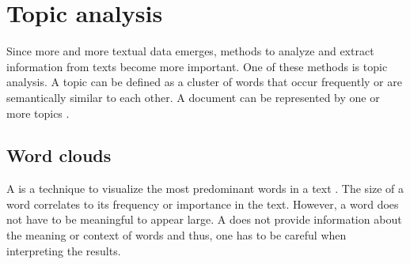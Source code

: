 \section{Topic analysis}\label{sec:topic-modeling}

Since more and more textual data emerges, methods to analyze and extract information from texts become more important.
One of these methods is topic analysis.
A topic can be defined as a cluster of words that occur frequently or are semantically similar to each other.
A document can be represented by one or more topics \cite{topic_modeling2015}.

%





\subsection{Word clouds}\label{subsec:word-clouds}

A \wordcloud{} is a technique to visualize the most predominant words in a text \cite{topic_modeling2019}.
The size of a word correlates to its frequency or importance in the text.
However, a word does not have to be meaningful to appear large.
A \wordcloud{} does not provide information about the meaning or context of words and thus, 
one has to be careful when interpreting the results.